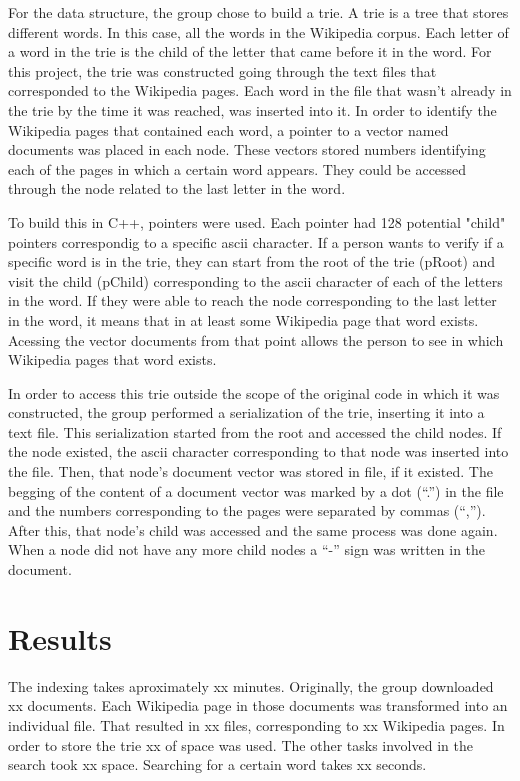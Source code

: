 \documentclass{article}
\begin{document}
For the data structure, the group chose to build a trie. A trie is a tree that stores different words. In this case, all the words in the Wikipedia corpus. Each letter of a word in the trie is the child of the letter that came before it in the word. 
For this project, the trie was constructed going through the text files that corresponded to the Wikipedia pages. Each word in the file that wasn't already in the trie by the time it was reached, was inserted into it. In order to identify the Wikipedia pages that contained each word, a pointer to a vector named documents was placed in each node. These vectors stored numbers identifying each of the pages in which a certain word appears. They could be accessed through the node related to the last letter in the word. 

To build this in C++, pointers were used. Each pointer had 128 potential "child" pointers correspondig to a specific ascii character. If a person wants to verify if a specific word is in the trie, they can start from the root of the trie (pRoot) and visit the child (pChild) corresponding to the ascii character of each of the letters in the word. If they were able to reach the node corresponding to the last letter in the word, it means that in at least some Wikipedia page that word exists. Acessing the vector documents from that point allows the person to see in which Wikipedia pages that word exists.


In order to access this trie outside the scope of the original code in which it was constructed, the group performed a serialization of the trie, inserting it into a text file. This serialization started from the root and accessed the child nodes. If the node existed, the ascii character corresponding to that node was inserted into the file. Then, that node's  document vector was stored in file, if it existed. The begging of the content of a document vector was marked by a dot (``.'') in the file and the numbers corresponding to the pages were separated by commas (``,''). After this, that node's child was accessed and the same process was done again. When a node did not have any more child nodes a ``-'' sign was written in the document. 







\section*{Results}
The indexing takes aproximately xx minutes. Originally, the group downloaded xx documents. Each Wikipedia page in those documents was transformed into an individual file. That resulted in xx files, corresponding to xx Wikipedia pages. In order to store the trie xx of space was used. The other tasks involved in the search took xx space. Searching for a certain word takes xx seconds. 
\end{document}
